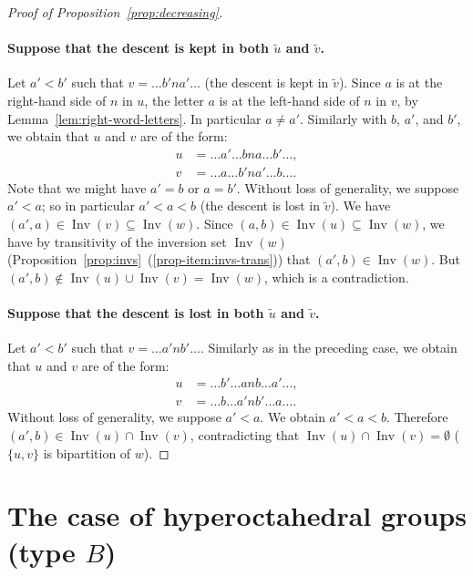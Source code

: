 \documentclass[Unicode]{cedram-alco}
\theoremstyle{definition}
\DeclareMathOperator{\invs}{Inv}
\newcommand{\dec}[1]{\widetilde{#1}}
\begin{document}
\begin{proof}[Proof of Proposition~\ref{prop:decreasing}]
\paragraph{Suppose that the descent is kept in both $\dec{u}$ and $\dec{v}$.} Let  $a' < b'$ such that $v=\dots b'na'\dots$ (the descent is kept in $\dec{v}$). Since  $a$ is at the right-hand side  of $n$ in $u$, the letter $a$ is at the left-hand side of $n$ in $v$, by Lemma~\ref{lem:right-word-letters}. In particular $a \neq a'$. Similarly with  $b$, $a'$, and $b'$, we obtain that $u$ and $v$ are of the form:
\begin{align*}
u &= \dots a' \dots bna \dots b'  \dots, \\
v &= \dots a \dots b' n a' \dots b \dots.
\end{align*}
Note that we might have $a' = b$ or $a = b'$. Without loss of generality, we suppose $a' < a$; so in particular $a' < a < b$ (the descent is lost in $\dec{v}$). We have $(a', a) \in \invs(v) \subseteq \invs(w)$. Since  $(a,b) \in \invs(u) \subseteq \invs(w)$, we have by transitivity of the inversion set $\invs(w)$ (Proposition~\ref{prop:invs}~(\ref{prop-item:invs-trans})) that $(a', b) \in \invs(w)$. But $(a', b)\notin\invs(u)\cup\invs(v)=\invs(w)$, which is a contradiction.

\paragraph{Suppose that the descent is lost in both $\dec{u}$ and $\dec{v}$.} Let  $a' < b'$ such that $v=\dots a'nb'\dots$. Similarly as in the preceding case,  we obtain that $u$ and $v$ are of the form:
\begin{align*}
u &= \dots b' \dots anb \dots a'  \dots, \\
v &= \dots b \dots a' n b' \dots a \dots.
\end{align*}
Without loss of generality, we suppose $a' < a$. We obtain $a' < a < b$. Therefore $(a', b) \in \invs(u) \cap \invs(v)$, contradicting that $\invs(u) \cap \invs(v) = \emptyset$ ($\{u,v\}$ is bipartition of $w$).
\end{proof}


\section{The case of hyperoctahedral groups (type \texorpdfstring{$B$}{B})}\label{se:Bn}
\end{document}
